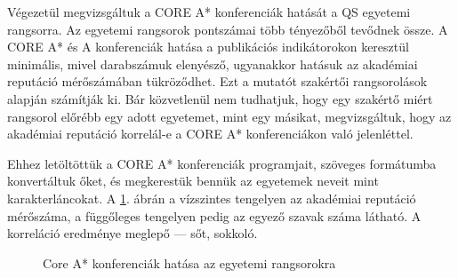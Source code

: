 \documentclass[12pt,a4paper]{article}
\begin{document}
Végezetül megvizsgáltuk a CORE A\!* konferenciák hatását a QS egyetemi rangsorra. Az egyetemi rangsorok pontszámai több tényezőből tevődnek össze. A CORE A\!* és A konferenciák hatása a publikációs indikátorokon keresztül minimális, mivel darabszámuk elenyésző, ugyanakkor hatásuk az akadémiai reputáció mérőszámában tükröződhet. Ezt a mutatót szakértői rangsorolások alapján számítják ki. Bár közvetlenül nem tudhatjuk, hogy egy szakértő miért rangsorol előrébb egy adott egyetemet, mint egy másikat, megvizsgáltuk, hogy az akadémiai reputáció korrelál-e a CORE A\!* konferenciákon való jelenléttel.

Ehhez letöltöttük a CORE A\!* konferenciák programjait, szöveges formátumba konvertáltuk őket, és megkerestük bennük az egyetemek neveit mint karakterláncokat. A \ref{fig:egytemi_rangsor}. ábrán a vízszintes tengelyen az akadémiai reputáció mérőszáma, a függőleges tengelyen pedig az egyező szavak száma látható. A korreláció eredménye meglepő — sőt, sokkoló.

\begin{figure}[h]
  \centering
  
  \caption{Core A\!* konferenciák hatása az egyetemi rangsorokra}\label{fig:egytemi_rangsor}
\end{figure}

%
%
\end{document}
